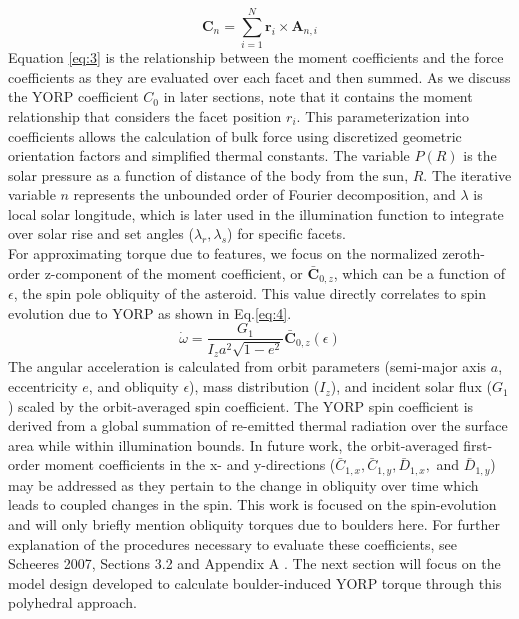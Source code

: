 \begin{equation}\label{eq:3}
    \mathbf{C}_n = \sum_{i=1}^{N} \mathbf{r}_i \times \mathbf{A}_{n,i}
\end{equation}
Equation \ref{eq:3} is the relationship between the moment coefficients and the force coefficients as they are evaluated over each facet and then summed. As we discuss the YORP coefficient $C_{0}$ in later sections, note that it contains the moment relationship that considers the facet position $r_i$.
This parameterization into coefficients allows the calculation of bulk force using discretized geometric orientation factors and simplified thermal constants. The variable $P(R)$ is the solar pressure as a function of distance of the body from the sun, $R$. The iterative variable $n$ represents the unbounded order of Fourier decomposition, and $\lambda$ is local solar longitude, which is later used in the illumination function to integrate over solar rise and set angles ($\lambda_r, \lambda_s$) for specific facets. 
\\ \indent 
For approximating torque due to features, we focus on the normalized zeroth-order z-component of the moment coefficient, or $\bar{\textbf{C}}_{0,z}$, which can be a function of $\epsilon$, the spin pole obliquity of the asteroid. This value directly correlates to spin evolution due to YORP as shown in Eq.\ref{eq:4}. 
\begin{equation}\label{eq:4}
    \dot{\omega} = \frac{G_1}{I_z a^2 \sqrt{1-e^2}} \bar{\textbf{C}}_{0,z}(\epsilon)
\end{equation}
The angular acceleration is calculated from orbit parameters (semi-major axis $a$, eccentricity $e$, and obliquity $\epsilon$), mass distribution ($I_z$), and incident solar flux ($G_1$) scaled by the orbit-averaged spin coefficient. The YORP spin coefficient is derived from a global summation of re-emitted thermal radiation over the surface area while within illumination bounds. In future work, the orbit-averaged first-order moment coefficients in the x- and y-directions ($\bar{C}_{1,x}, \bar{C}_{1,y}, \bar{D}_{1,x},$ and $\bar{D}_{1,y}$) may be addressed as they pertain to the change in obliquity over time which leads to coupled changes in the spin. This work is focused on the spin-evolution and will only briefly mention obliquity torques due to boulders here. 
For further explanation of the procedures necessary to evaluate these coefficients, see Scheeres 2007, Sections 3.2 and Appendix A \citep{Scheeres2007}. The next section will focus on the model design developed to calculate boulder-induced YORP torque through this polyhedral approach. 
